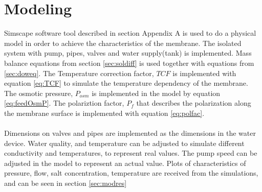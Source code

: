 \section{Modeling}
Simscape software tool described in section Appendix A is used to do a physical model in order to achieve the characteristics of the membrane. The isolated system with pump, pipes, valves and water supply(tank) is implemented. Mass balance equations from section \ref{sec:soldiff} is used together with equations from \ref{sec:doweq}. The Temperature correction factor, $TCF$ is implemented with equation \ref{eq:TCF} to simulate the temperature dependency of the membrane. The osmotic pressure, $P_{osm}$ is implemented in the model by equation \ref{eq:feedOsmP}. The polariztion factor, $P_{f}$ that describes the polarization along the membrane surface is implemented with equation \ref{eq:polfac}. 
\\
\\
Dimensions on valves and pipes are implemented as the dimensions in the water device. Water quality, and temperature can be adjusted to simulate different conductivity and temperatures, to represent real values. The pump speed can be adjusted in the model to represent an actual value. Plots of characteristics of pressure, flow, salt concentration, temperature are received from the simulations, and can be seen in section \ref{sec:modres}

